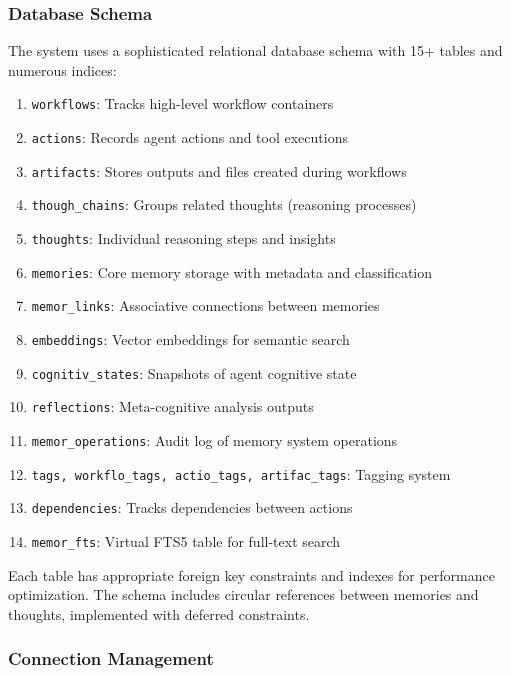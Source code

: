 \documentclass[12pt,a4paper]{article}
\newcommand{\code}[1]{\texttt{#1}}
\begin{document}
\subsubsection*{Database Schema}

The system uses a sophisticated relational database schema with 15+ tables and numerous indices:

\begin{enumerate}[label=\arabic*.]
    \item \code{workflows}: Tracks high-level workflow containers
    \item \code{actions}: Records agent actions and tool executions
    \item \code{artifacts}: Stores outputs and files created during workflows
    \item \code{though\1\_chains}: Groups related thoughts (reasoning processes)
    \item \code{thoughts}: Individual reasoning steps and insights
    \item \code{memories}: Core memory storage with metadata and classification
    \item \code{memor\1\_links}: Associative connections between memories
    \item \code{embeddings}: Vector embeddings for semantic search
    \item \code{cognitiv\1\_states}: Snapshots of agent cognitive state
    \item \code{reflections}: Meta-cognitive analysis outputs
    \item \code{memor\1\_operations}: Audit log of memory system operations
    \item \code{tags, workflo\1\_tags, actio\1\_tags, artifac\1\_tags}: Tagging system
    \item \code{dependencies}: Tracks dependencies between actions
    \item \code{memor\1\_fts}: Virtual FTS5 table for full-text search
\end{enumerate}

Each table has appropriate foreign key constraints and indexes for performance optimization. The schema includes circular references between memories and thoughts, implemented with deferred constraints.

\subsubsection*{Connection Management}
\end{document}
